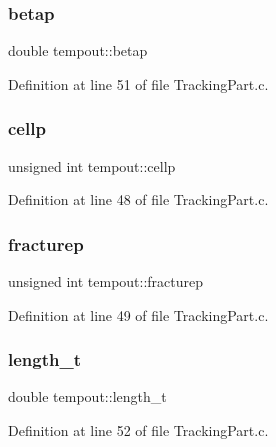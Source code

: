 \subsubsection{\texorpdfstring{betap}{betap}}
{\footnotesize\ttfamily double tempout\+::betap}



Definition at line 51 of file Tracking\+Part.\+c.

\mbox{\label{structtempout_a959460ad7a7becc867670385c6540dcd}} 
\subsubsection{\texorpdfstring{cellp}{cellp}}
{\footnotesize\ttfamily unsigned int tempout\+::cellp}



Definition at line 48 of file Tracking\+Part.\+c.

\mbox{\label{structtempout_aae2e06cd449b82338982dfcbeaacfe13}} 
\subsubsection{\texorpdfstring{fracturep}{fracturep}}
{\footnotesize\ttfamily unsigned int tempout\+::fracturep}



Definition at line 49 of file Tracking\+Part.\+c.

\mbox{\label{structtempout_a56ef223d6bce6cfa895728b327d2bd82}} 
\subsubsection{\texorpdfstring{length\_t}{length\_t}}
{\footnotesize\ttfamily double tempout\+::length\+\_\+t}



Definition at line 52 of file Tracking\+Part.\+c.

\mbox{\label{structtempout_a766494dc449f55f34cbb0404c0b3823a}} 
